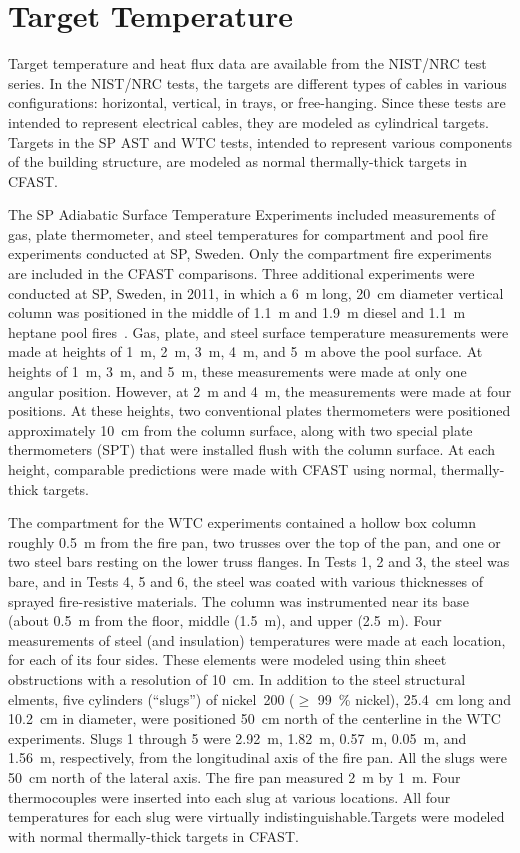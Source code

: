 \section{Target Temperature}

Target temperature and heat flux data are available from the NIST/NRC test series.  In the NIST/NRC tests, the targets are different types of cables in various configurations: horizontal, vertical, in trays, or free-hanging. Since these tests are intended to represent electrical cables, they are modeled as cylindrical targets. Targets in the SP AST and WTC tests, intended to represent various components of the building structure, are modeled as normal thermally-thick targets in CFAST. 

The SP Adiabatic Surface Temperature Experiments included measurements of gas, plate thermometer, and steel temperatures for compartment and pool fire experiments conducted at SP, Sweden. Only the compartment fire experiments are included in the CFAST comparisons. Three additional experiments were conducted at SP, Sweden, in 2011, in which a 6~m long, 20~cm diameter vertical column was positioned in the middle of 1.1~m and 1.9~m diesel and 1.1~m heptane pool fires~\cite{Sjostrom:AST}. Gas, plate, and steel surface temperature measurements were made at heights of 1~m, 2~m, 3~m, 4~m, and 5~m above the pool surface. At heights of 1~m, 3~m, and 5~m, these measurements were made at only one angular position. However, at 2~m and 4~m, the measurements were made at four positions. At these heights, two conventional plates thermometers were positioned approximately 10~cm from the column surface, along with two special plate thermometers (SPT) that were installed flush with the column surface. At each height, comparable predictions were made with CFAST using normal, thermally-thick targets.

The compartment for the WTC experiments contained a hollow box column roughly 0.5~m from the fire pan, two trusses over the top of the pan, and one or two steel bars resting on the lower truss flanges. In Tests 1, 2 and 3, the steel was bare, and in Tests 4, 5 and 6, the steel was coated with various thicknesses of sprayed fire-resistive materials. The column was instrumented near its base (about 0.5~m from the floor, middle (1.5~m), and upper (2.5~m). Four measurements of steel (and insulation) temperatures were made at each location, for each of its four sides. These elements were modeled using thin sheet obstructions with a resolution of 10~cm. In addition to the steel structural elments, five cylinders (``slugs'') of nickel~200 ($\ge$ 99~\% nickel), 25.4~cm long and 10.2~cm in diameter, were positioned 50~cm north of the centerline in the WTC experiments. Slugs 1 through 5 were 2.92~m, 1.82~m, 0.57~m, 0.05~m, and 1.56~m, respectively, from the longitudinal axis of the fire pan. All the slugs were 50~cm north of the lateral axis. The fire pan measured 2~m by 1~m. Four thermocouples were inserted into each slug at various locations. All four temperatures for each slug were virtually indistinguishable.Targets were modeled with normal thermally-thick targets in CFAST.

